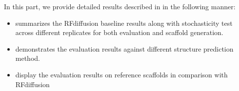 In this part, we provide detailed results described in  in the following manner:
\begin{itemize}
    \item{\textbf{} summarizes the RFdiffusion baseline results along with stochasticity test across different replicates for both evaluation and scaffold generation.}
    \item{\textbf{} demonstrates the evaluation results against different structure prediction method. }
    \item{\textbf{} display the evaluation results on reference scaffolds in comparison with RFdiffusion}
\end{itemize}


